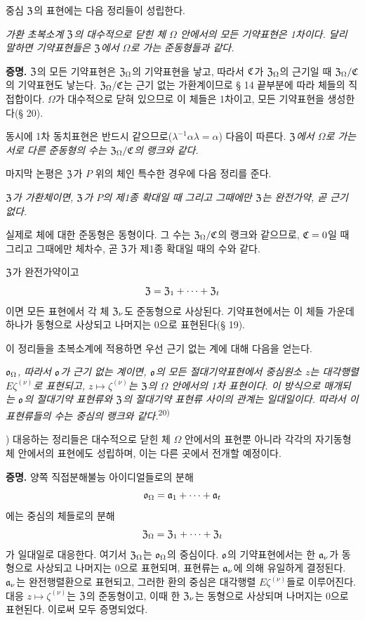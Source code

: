 중심 \(\mathfrak Z\)의 표현에는 다음 정리들이 성립한다.

\emph{가환 초복소계 \(\mathfrak Z\)의 대수적으로 닫힌 체 \(\Omega\) 안에서의 모든 기약표현은 1차이다. 달리 말하면 기약표현들은 \(\mathfrak Z\)에서 \(\Omega\)로 가는 준동형들과 같다.}

\textbf{증명.} \(\mathfrak Z\)의 모든 기약표현은 \(\mathfrak Z_\Omega\)의 기약표현을 낳고, 따라서 \(\mathfrak{C}\)가 \(\mathfrak Z_\Omega\)의 근기일 때 \(\mathfrak Z_\Omega/\mathfrak{C}\)의 기약표현도 낳는다. \(\mathfrak Z_\Omega/\mathfrak{C}\)는 근기 없는 가환계이므로 § 14 끝부분에 따라 체들의 직접합이다. \(\Omega\)가 대수적으로 닫혀 있으므로 이 체들은 1차이고, 모든 기약표현을 생성한다(§ 20).

동시에 1차 동치표현은 반드시 같으므로(\(\lambda^{-1}\alpha\lambda=\alpha\)) 다음이 따른다. \emph{\(\mathfrak Z\)에서 \(\Omega\)로 가는 서로 다른 준동형의 수는 \(\mathfrak Z_\Omega/\mathfrak{C}\)의 랭크와 같다.}

마지막 논평은 \(\mathfrak Z\)가 \(P\) 위의 체인 특수한 경우에 다음 정리를 준다.

\emph{\(\mathfrak Z\)가 가환체이면, \(\mathfrak Z\)가 \(P\)의 제1종 확대일 때 그리고 그때에만 \(\mathfrak Z\)는 완전가약, 곧 근기 없다.}

실제로 체에 대한 준동형은 동형이다. 그 수는 \(\mathfrak Z_\Omega/\mathfrak{C}\)의 랭크와 같으므로, \(\mathfrak{C}=0\)일 때 그리고 그때에만 체차수, 곧 \(\mathfrak Z\)가 제1종 확대일 때의 수와 같다.

\(\mathfrak Z\)가 완전가약이고
\[
        \mathfrak Z=\mathfrak Z_1+\cdots+\mathfrak Z_t
\]
이면 모든 표현에서 각 체 \(\mathfrak Z_\nu\)도 준동형으로 사상된다. 기약표현에서는 이 체들 가운데 하나가 동형으로 사상되고 나머지는 0으로 표현된다(§ 19).

이 정리들을 초복소계에 적용하면 우선 근기 없는 계에 대해 다음을 얻는다.

\emph{\(\mathfrak o_\Omega\), 따라서 \(\mathfrak o\)가 근기 없는 계이면, \(\mathfrak o\)의 모든 절대기약표현에서 중심원소 \(z\)는 대각행렬 \(E\zeta^{(\nu)}\)로 표현되고, \(z\mapsto\zeta^{(\nu)}\)는 \(\mathfrak Z\)의 \(\Omega\) 안에서의 1차 표현이다. 이 방식으로 매개되는 \(\mathfrak o\)의 절대기약 표현류와 \(\mathfrak Z\)의 절대기약 표현류 사이의 관계는 일대일이다. 따라서 이 표현류들의 수는 중심의 랭크와 같다.}\textsuperscript{20)}

{\footnotesize{}) 대응하는 정리들은 대수적으로 닫힌 체 \(\Omega\) 안에서의 표현뿐 아니라 각각의 자기동형체 안에서의 표현에도 성립하며, 이는 다른 곳에서 전개할 예정이다.\par}

\textbf{증명.} 양쪽 직접분해불능 아이디얼들로의 분해
\[
        \mathfrak o_\Omega=\mathfrak{a}_1+\cdots+\mathfrak{a}_t
\]
에는 중심의 체들로의 분해
\[
        \mathfrak Z_\Omega=\mathfrak Z_1+\cdots+\mathfrak Z_t
\]
가 일대일로 대응한다. 여기서 \(\mathfrak Z_\Omega\)는 \(\mathfrak o_\Omega\)의 중심이다. \(\mathfrak o\)의 기약표현에서는 한 \(\mathfrak{a}_\nu\)가 동형으로 사상되고 나머지는 0으로 표현되며, 표현류는 \(\mathfrak{a}_\nu\)에 의해 유일하게 결정된다. \(\mathfrak{a}_\nu\)는 완전행렬환으로 표현되고, 그러한 환의 중심은 대각행렬 \(E\zeta^{(\nu)}\)들로 이루어진다. 대응 \(z\mapsto\zeta^{(\nu)}\)는 \(\mathfrak Z\)의 준동형이고, 이때 한 \(\mathfrak Z_\nu\)는 동형으로 사상되며 나머지는 0으로 표현된다. 이로써 모두 증명되었다.

